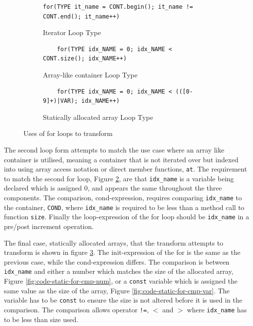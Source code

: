 \documentclass[bsc,frontabs,singlespacing,twoside,parskip,deptreport]{infthesis}
\begin{document}
\begin{figure}[h]
    \centering
    \begin{subfigure}[h]{\textwidth}
        \centering
        \begin{verbatim}
for(TYPE it_name = CONT.begin(); it_name != CONT.end(); it_name++)
        \end{verbatim}
        \caption{Iterator Loop Type }
        \label{fig:code-for-iter}
        \vspace{0.2cm}
    \end{subfigure}
    
    \begin{subfigure}[h]{\textwidth}
    \begin{verbatim}
    for(TYPE idx_NAME = 0; idx_NAME < CONT.size(); idx_NAME++)
    \end{verbatim}
    \caption{Array-like container Loop Type}
    \centering
    \vspace{0.2cm}
    \label{fig:code-for-container}
    \end{subfigure}

    \begin{subfigure}[h]{\textwidth}
    \begin{verbatim}
    for(TYPE idx_NAME = 0; idx_NAME < (([0-9]+)|VAR); idx_NAME++)
    \end{verbatim}
    \caption{Statically allocated array Loop Type}
    \centering
    \label{fig:code-for-stat}
    \end{subfigure}
    
    \caption{Uses of for loops to transform}
    \label{fig:code-for-types}
\end{figure}


The second loop form attempts to match the use case where an array like container is utilised, meaning a container that is not iterated over but indexed into using array access notation or direct member functions, \texttt{at}. The requirement to match the second for loop, Figure \ref{fig:code-for-container}, are that \texttt{idx\_name} is a variable being declared which is assigned 0, and appears the same throughout the three components. The comparison, cond-expression, requires comparing \texttt{idx\_name} to the container, \texttt{COND}, where \texttt{idx\_name} is required to be less than a method call to function \texttt{size}. Finally the loop-expression of the for loop should be \texttt{idx\_name} in a pre/post increment operation.

The final case, statically allocated arrays, that the transform attempts to transform is shown in figure \ref{fig:code-for-stat}. The init-expression of the for is the same as the previous case, while the cond-expression differs. The comparison is between \texttt{idx\_name} and either a number which matches the size of the allocated array, Figure \ref{fig:code-static-for-cmp-num}, or a \texttt{const} variable which is assigned the same value as the size of the array, Figure \ref{fig:code-static-for-cmp-var}. The variable has to be \texttt{const} to ensure the size is not altered before it is used in the comparison. The comparison allows operator \texttt{!=}, $<$ and $>$ where \texttt{idx\_name} has to be less than size used. 
\end{document}
